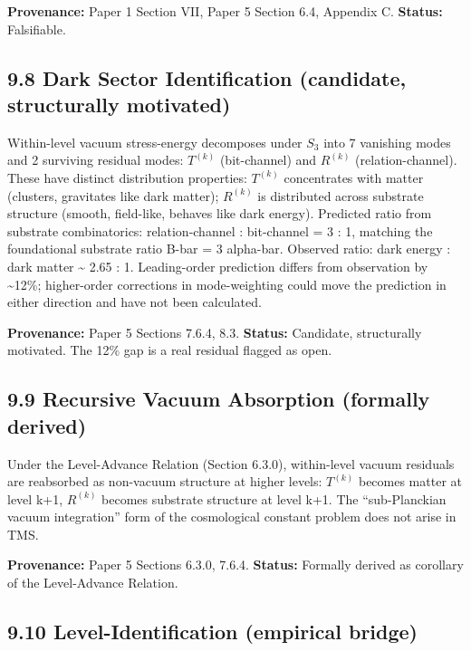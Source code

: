 \documentclass[11pt,oneside]{report}
\theoremstyle{definition}
\theoremstyle{remark}
\begin{document}
\textbf{Provenance:} Paper 1 Section VII, Paper 5 Section 6.4, Appendix
C. \textbf{Status:} Falsifiable.

\subsection*{9.8 Dark Sector Identification (candidate, structurally motivated)}

Within-level vacuum stress-energy decomposes under \ensuremath{S_{3}} into 7 vanishing
modes and 2 surviving residual modes: \ensuremath{T^{(k)}} (bit-channel) and
\ensuremath{R^{(k)}} (relation-channel). These have distinct distribution
properties: \ensuremath{T^{(k)}} concentrates with matter (clusters, gravitates like
dark matter); \ensuremath{R^{(k)}} is distributed across substrate structure
(smooth, field-like, behaves like dark energy). Predicted ratio from
substrate combinatorics: relation-channel : bit-channel = 3 : 1,
matching the foundational substrate ratio B-bar = 3 alpha-bar. Observed
ratio: dark energy : dark matter \textasciitilde{} 2.65 : 1.
Leading-order prediction differs from observation by
\textasciitilde12\%; higher-order corrections in mode-weighting could
move the prediction in either direction and have not been calculated.

\textbf{Provenance:} Paper 5 Sections 7.6.4, 8.3. \textbf{Status:}
Candidate, structurally motivated. The 12\% gap is a real residual
flagged as open.

\subsection*{9.9 Recursive Vacuum Absorption (formally derived)}

Under the Level-Advance Relation (Section 6.3.0), within-level vacuum
residuals are reabsorbed as non-vacuum structure at higher levels:
\ensuremath{T^{(k)}} becomes matter at level k+1, \ensuremath{R^{(k)}} becomes substrate
structure at level k+1. The ``sub-Planckian vacuum integration'' form of
the cosmological constant problem does not arise in TMS.

\textbf{Provenance:} Paper 5 Sections 6.3.0, 7.6.4. \textbf{Status:}
Formally derived as corollary of the Level-Advance Relation.

\subsection*{9.10 Level-Identification (empirical bridge)}
\end{document}
